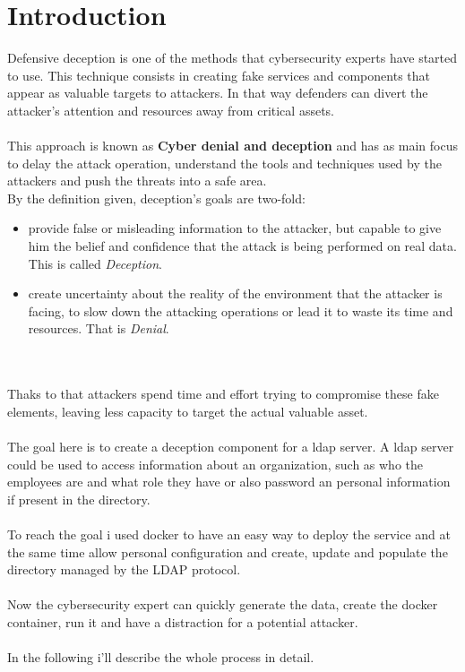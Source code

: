 \chapter*{Introduction}
Defensive deception is one of the methods that cybersecurity experts have started to use. This technique consists in creating fake services and components that appear as valuable targets to attackers.
In that way defenders can divert the attacker’s attention and resources away from critical assets.\\\\
This approach is known as \textbf{Cyber denial and deception} and has as main focus to delay the attack operation, understand the tools and techniques used by the attackers and push the threats into a safe area.\\
By the definition given, deception's goals are two-fold:
\begin{itemize}
    \item provide false or misleading information to the attacker, but capable to give him the belief and confidence that the attack is being performed on real data. This is called \emph{Deception}.
    \item create uncertainty about the reality of the environment that the attacker is facing, to slow down the attacking operations or lead it to waste its time and resources. That is \emph{Denial}.
\end{itemize}
\\\\
Thaks to that attackers spend time and effort trying to compromise these fake elements, leaving less capacity to target the actual valuable asset. 
\\\\
The goal here is to create a deception component for a ldap server. A ldap server could be used to access information about an organization, such as who the employees are and what role they have or also password an personal information if present in the directory. 
\\\\
To reach the goal i used docker to have an easy way to deploy the service and at the same time allow personal configuration and create, update and populate the directory managed by the LDAP protocol. 
\\\\
Now the cybersecurity expert can quickly generate the data, create the docker container, run it and have a distraction for a potential attacker. 
\\\\
In the following i'll describe the whole process in detail.


